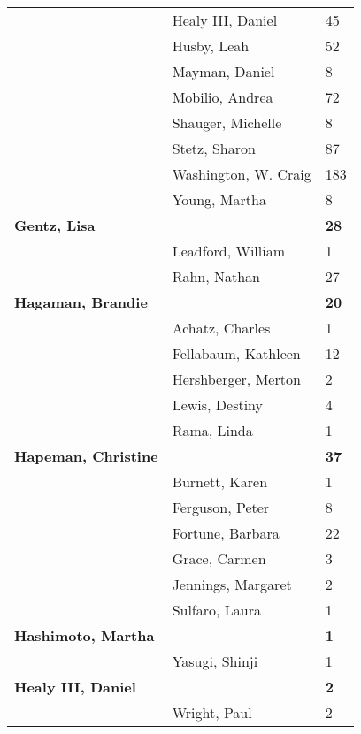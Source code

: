 \documentclass{article}\usepackage[]{graphicx}\usepackage[]{color}
\begin{document}
{\begin{longtable} { >{\raggedright}p{}|p{}p{}}
   \rowcolor[gray]{0.90} & Healy III, Daniel & 45 \\ 
   \rowcolor[gray]{0.90} & Husby, Leah & 52 \\ 
   & Mayman, Daniel & 8 \\ 
   & Mobilio, Andrea & 72 \\ 
   & Shauger, Michelle & 8 \\ 
   \rowcolor[gray]{0.90} & Stetz, Sharon & 87 \\ 
   \rowcolor[gray]{0.90} & Washington, W. Craig & 183 \\ 
   \rowcolor[gray]{0.90} & Young, Martha & 8 \\ 
  \textbf{Gentz, Lisa} &  & \hspace{2cm}\textbf{28} \\ 
   & Leadford, William & 1 \\ 
   & Rahn, Nathan & 27 \\ 
   \rowcolor[gray]{0.90}\textbf{Hagaman, Brandie} &  & \hspace{2cm}\textbf{20} \\ 
   \rowcolor[gray]{0.90} & Achatz, Charles & 1 \\ 
   \rowcolor[gray]{0.90} & Fellabaum, Kathleen & 12 \\ 
   & Hershberger, Merton & 2 \\ 
   & Lewis, Destiny & 4 \\ 
   & Rama, Linda & 1 \\ 
   \rowcolor[gray]{0.90}\textbf{Hapeman, Christine} &  & \hspace{2cm}\textbf{37} \\ 
   \rowcolor[gray]{0.90} & Burnett, Karen & 1 \\ 
   \rowcolor[gray]{0.90} & Ferguson, Peter & 8 \\ 
   & Fortune, Barbara & 22 \\ 
   & Grace, Carmen & 3 \\ 
   & Jennings, Margaret & 2 \\ 
   \rowcolor[gray]{0.90} & Sulfaro, Laura & 1 \\ 
   \rowcolor[gray]{0.90}\textbf{Hashimoto, Martha} &  & \hspace{2cm}\textbf{1} \\ 
   \rowcolor[gray]{0.90} & Yasugi, Shinji & 1 \\ 
  \textbf{Healy III, Daniel} &  & \hspace{2cm}\textbf{2} \\ 
   & Wright, Paul & 2 \\ 

\end{longtable}}
\end{document}
